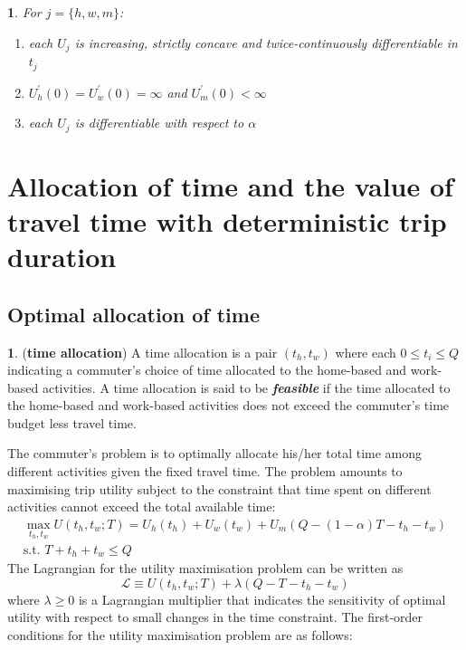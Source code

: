 \documentclass[12pt,a4paper,british]{article}
\theoremstyle{definition}
\newtheorem{defn}{\protect\definitionname}
\theoremstyle{plain}
\theoremstyle{plain}
\theoremstyle{plain}
\newtheorem{assumption}{\protect\assumptionname}
\providecommand{\definitionname}{Definition}
\providecommand{\assumptionname}{Assumption}
\begin{document}
\begin{assumption}
    For $j=\{h,w,m\}$: 
    \begin{enumerate}
        \item each $U_j$ is increasing, strictly concave and twice-continuously differentiable in $t_j$
        \item $U_{h}^{\prime}\left(0\right) = U_{w}^{\prime}\left(0\right) = \infty$ and $U_{m}^{\prime}\left(0\right)<\infty$
        \item each $U_j$ is differentiable with respect to $\alpha$
    \end{enumerate}
\end{assumption}

\section{Allocation of time and the value of travel time with deterministic trip duration}

\subsection{Optimal allocation of time}
\begin{defn}
(\textbf{time allocation}) A time allocation is a pair $\left(t_{h},t_{w}\right)$ where each $0\leq t_{i}\leq Q$ indicating a commuter's choice of time allocated to the home-based and work-based activities. A time allocation is said to be \textbf{\textit{feasible}} if the time allocated to the home-based and work-based activities does not exceed the commuter's time budget less travel time.
\end{defn}
The commuter's problem is to optimally allocate his/her total time among different activities given the fixed travel time. The problem
amounts to maximising trip utility subject to the constraint that time spent on different activities cannot exceed the total available
time:
\begin{gather*}
\max_{t_{h},t_{w}}U\left(t_{h},t_{w};T\right)=U_{h}\left(t_{h}\right)+U_{w}\left(t_{w}\right)+U_{m}\left(Q-\left(1-\alpha\right)T-t_{h}-t_{w}\right)\\
\mbox{s.t. }T+t_{h}+t_{w}\leq Q
\end{gather*}
 The Lagrangian for the utility maximisation problem can be written as
\begin{equation*}
\mathcal{L}\equiv U\left(t_{h},t_{w};T\right)+\lambda\left(Q-T-t_{h}-t_{w}\right)
\end{equation*}%
where $\lambda\geq0$ is a Lagrangian multiplier that indicates the sensitivity of optimal utility with respect to small changes in the time constraint. The first-order conditions for the utility maximisation problem are as follows:
\end{document}
